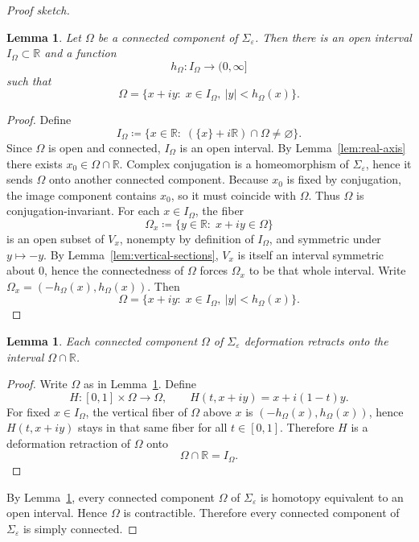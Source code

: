 \documentclass[11pt]{article}
\newtheorem{lemma}[theorem]{Lemma}
\begin{document}
\begin{proof}[Proof sketch]
\begin{lemma}\label{lem:component-fibers}
Let \(\Omega\) be a connected component of \(\Sigma_\varepsilon\). Then there is an
open interval \(I_\Omega\subset\mathbb R\) and a function
\[
h_\Omega:I_\Omega\to(0,\infty]
\]
such that
\[
\Omega
=
\{x+iy:\; x\in I_\Omega,\ |y|<h_\Omega(x)\}.
\]
\end{lemma}

\begin{proof}
Define
\[
I_\Omega
\coloneqq
\{x\in\mathbb R:\; (\{x\}+i\mathbb R)\cap\Omega\neq\varnothing\}.
\]
Since \(\Omega\) is open and connected, \(I_\Omega\) is an open interval.
By Lemma~\ref{lem:real-axis} there exists \(x_0\in\Omega\cap\mathbb R\).
Complex conjugation is a homeomorphism of \(\Sigma_\varepsilon\), hence it sends
\(\Omega\) onto another connected component.
Because \(x_0\) is fixed by conjugation, the image component contains \(x_0\),
so it must coincide with \(\Omega\).
Thus \(\Omega\) is conjugation-invariant.
For each \(x\in I_\Omega\), the fiber
\[
\Omega_x
\coloneqq
\{y\in\mathbb R:\; x+iy\in\Omega\}
\]
is an open subset of \(V_x\), nonempty by definition of \(I_\Omega\), and symmetric
under \(y\mapsto -y\).
By Lemma~\ref{lem:vertical-sections}, \(V_x\) is itself an interval symmetric about
\(0\), hence the connectedness of \(\Omega\) forces \(\Omega_x\) to be that whole
interval.
Write \(\Omega_x=(-h_\Omega(x),h_\Omega(x))\).
Then
\[
\Omega
=
\{x+iy:\; x\in I_\Omega,\ |y|<h_\Omega(x)\}.
\]
\end{proof}

\begin{lemma}\label{lem:deformation-retract}
Each connected component \(\Omega\) of \(\Sigma_\varepsilon\) deformation retracts
onto the interval \(\Omega\cap\mathbb R\).
\end{lemma}

\begin{proof}
Write \(\Omega\) as in Lemma~\ref{lem:component-fibers}.
Define
\[
H:[0,1]\times\Omega\longrightarrow\Omega,
\qquad
H(t,x+iy)=x+i(1-t)y.
\]
For fixed \(x\in I_\Omega\), the vertical fiber of \(\Omega\) above \(x\) is
\((-h_\Omega(x),h_\Omega(x))\), hence \(H(t,x+iy)\) stays in that same fiber for
all \(t\in[0,1]\).
Therefore \(H\) is a deformation retraction of \(\Omega\) onto
\[
\Omega\cap\mathbb R=I_\Omega.
\]
\end{proof}

By Lemma~\ref{lem:deformation-retract}, every connected component \(\Omega\) of
\(\Sigma_\varepsilon\) is homotopy equivalent to an open interval. Hence \(\Omega\)
is contractible. Therefore every connected component of \(\Sigma_\varepsilon\) is
simply connected.
\end{proof}
\end{document}
